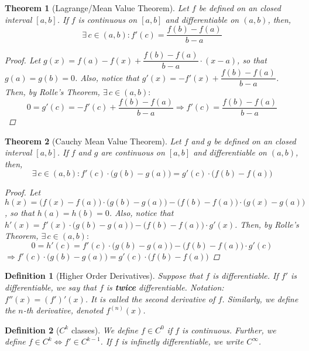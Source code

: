 \documentclass[12pt]{article}
\let\RA\Rightarrow
\let\LR\Leftrightarrow
\newcommand{\Exist}[1]{\exists\,{#1}:}
\newtheorem{theorem}{Theorem}[subsection]
\newtheorem{definition}{Definition}[subsection]
\begin{document}
\begin{theorem}[Lagrange/Mean Value Theorem]
  Let $f$ be defined on an closed interval $[a,b]$. If $f$ is continuous on $[a,b]$ and differentiable on $(a,b)$, then, $$\Exist{c\in(a,b)}f'(c)=\frac{f(b)-f(a)}{b-a}$$
  \begin{proof}
    Let $g(x)=f(a)-f(x)+\dfrac{f(b)-f(a)}{b-a}\cdot(x-a)$, so that $g(a)=g(b)=0$. Also, notice that $g'(x)=-f'(x)+\dfrac{f(b)-f(a)}{b-a}$. Then, by Rolle's Theorem, $\Exist{c\in(a,b)}$ $$0=g'(c)=-f'(c)+\frac{f(b)-f(a)}{b-a}\RA
    f'(c)=\frac{f(b)-f(a)}{b-a}$$
  \end{proof}
\end{theorem}

\begin{theorem}[Cauchy Mean Value Theorem]
  Let $f$ and $g$ be defined on an closed interval $[a,b]$. If $f$ and $g$ are continuous on $[a,b]$ and differentiable on $(a,b)$, then, $$\Exist{c\in(a,b)}f'(c)\cdot\big(g(b)-g(a)\big)=g'(c)\cdot\big(f(b)-f(a)\big)$$
  \begin{proof}
    Let $h(x)=\big(f(x)-f(a)\big)\cdot\big(g(b)-g(a)\big)-\big(f(b)-f(a)\big)\cdot\big(g(x)-g(a)\big)$, so that $h(a)=h(b)=0$. Also, notice that $h'(x)=f'(x)\cdot\big(g(b)-g(a)\big)-\big(f(b)-f(a)\big)\cdot g'(x)$. Then, by Rolle's Theorem, $\Exist{c\in(a,b)}$ $$0=h'(c)=f'(c)\cdot\big(g(b)-g(a)\big)-\big(f(b)-f(a)\big)\cdot g'(c)$$$\RA
    f'(c)\cdot\big(g(b)-g(a)\big)=g'(c)\cdot\big(f(b)-f(a)\big)$
  \end{proof}
\end{theorem}

\begin{definition}[Higher Order Derivatives]
  Suppose that $f$ is differentiable. If $f'$ is differentiable, we say that $f$ is \textbf{twice} differentiable. Notation: $f''(x)=(f')'(x)$. It is called the second derivative of $f$. Similarly, we define the $n$-th derivative, denoted $f^{(n)}(x)$.
\end{definition}

\begin{definition}[$C^k$ classes]
  We define $f\in C^0$ if $f$ is continuous. Further, we define $f\in C^k\LR f'\in C^{k-1}$. If $f$ is infinetly differentiable, we write $C^\infty$.
\end{definition}
\end{document}
